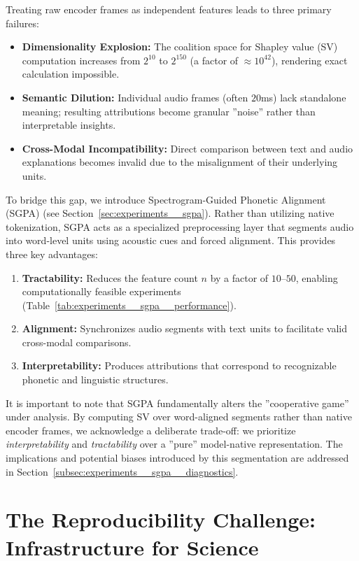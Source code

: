 Treating raw encoder frames as independent features leads to three primary failures:
\begin{itemize}
    \item \textbf{Dimensionality Explosion:} The coalition space for Shapley value (SV) computation increases from $2^{10}$ to $2^{150}$ (a factor of $\approx 10^{42}$), rendering exact calculation impossible.
    \item \textbf{Semantic Dilution:} Individual audio frames (often $20$ms) lack standalone meaning; resulting attributions become granular ''noise'' rather than interpretable insights.
    \item \textbf{Cross-Modal Incompatibility:} Direct comparison between text and audio explanations becomes invalid due to the misalignment of their underlying units.
\end{itemize}

To bridge this gap, we introduce Spectrogram-Guided Phonetic Alignment (SGPA) (see Section~\ref{sec:experiments__sgpa}). Rather than utilizing native tokenization, SGPA acts as a specialized preprocessing layer that segments audio into word-level units using acoustic cues and forced alignment. This provides three key advantages:
\begin{enumerate}[nosep]
    \item \textbf{Tractability:} Reduces the feature count $n$ by a factor of $10$--$50$, enabling computationally feasible experiments (Table~\ref{tab:experiments__sgpa__performance}).
    \item \textbf{Alignment:} Synchronizes audio segments with text units to facilitate valid cross-modal comparisons.
    \item \textbf{Interpretability:} Produces attributions that correspond to recognizable phonetic and linguistic structures.
\end{enumerate}

\newpage
It is important to note that SGPA fundamentally alters the ''cooperative game'' under analysis. By computing SV over word-aligned segments rather than native encoder frames, we acknowledge a deliberate trade-off: we prioritize \textit{interpretability} and \textit{tractability} over a ''pure'' model-native representation. The implications and potential biases introduced by this segmentation are addressed in Section~\ref{subsec:experiments__sgpa__diagnostics}.

\section{The Reproducibility Challenge: Infrastructure for Science}
\label{subsec:requirements__reproducibility}

